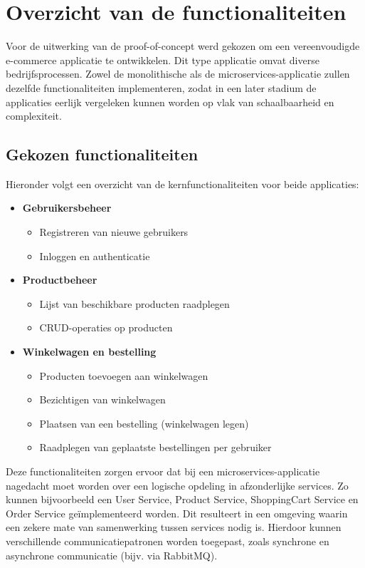\section{Overzicht van de functionaliteiten}

Voor de uitwerking van de proof-of-concept werd gekozen om een vereenvoudigde e-commerce applicatie te ontwikkelen. Dit type applicatie omvat diverse bedrijfsprocessen. Zowel de monolithische als de microservices-applicatie zullen dezelfde functionaliteiten implementeren, zodat in een later stadium de applicaties eerlijk vergeleken kunnen worden op vlak van schaalbaarheid en complexiteit.

\subsection{Gekozen functionaliteiten}

Hieronder volgt een overzicht van de kernfunctionaliteiten voor beide applicaties:

\begin{itemize}
	\item \textbf{Gebruikersbeheer}
	\begin{itemize}
		\item Registreren van nieuwe gebruikers
		\item Inloggen en authenticatie
	\end{itemize}
	\item \textbf{Productbeheer}
	\begin{itemize}
		\item Lijst van beschikbare producten raadplegen
		\item CRUD-operaties op producten
	\end{itemize}
	\item \textbf{Winkelwagen en bestelling}
	\begin{itemize}
		\item Producten toevoegen aan winkelwagen
		\item Bezichtigen van winkelwagen
		\item Plaatsen van een bestelling (winkelwagen legen)
		\item Raadplegen van geplaatste bestellingen per gebruiker
	\end{itemize}
\end{itemize}

Deze functionaliteiten zorgen ervoor dat bij een microservices-applicatie nagedacht moet worden over een logische opdeling in afzonderlijke services. Zo kunnen bijvoorbeeld een User Service, Product Service, ShoppingCart Service en Order Service geïmplementeerd worden. Dit resulteert in een omgeving waarin een zekere mate van samenwerking tussen services nodig is. Hierdoor kunnen verschillende communicatiepatronen worden toegepast, zoals synchrone en asynchrone communicatie (bijv. via RabbitMQ).

